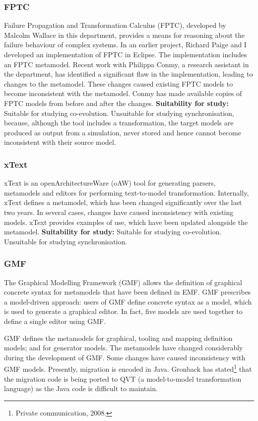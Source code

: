 \subsubsection{FPTC}
Failure Propagation and Transformation Calculus (FPTC), developed by Malcolm Wallace in this department, provides a means for reasoning about the failure behaviour of complex systems. In an earlier project, Richard Paige and I developed an implementation of FPTC in Eclipse. The implementation includes an FPTC metamodel. Recent work with Philippa Conmy, a research assistant in the department, has identified a significant flaw in the implementation, leading to changes to the metamodel. These changes caused existing FPTC models to become inconsistent with the metamodel. Conmy has made available copies of FPTC models from before and after the changes. \textbf{Suitability for study:} Suitable for studying co-evolution. Unsuitable for studying synchronisation, because, although the tool includes a transformation, the target models are produced as output from a simulation, never stored and hence cannot become inconsistent with their source model.

\subsubsection{xText}
xText is an openArchitectureWare (oAW) \cite{oaw} tool for generating parsers, metamodels and editors for performing text-to-model transformation. Internally, xText defines a metamodel, which has been changed significantly over the last two years. In several cases, changes have caused inconsistency with existing models. xText provides examples of use, which have been updated alongside the metamodel. \textbf{Suitability for study:} Suitable for studying co-evolution. Unsuitable for studying synchronisation.

\subsubsection{GMF}
The Graphical Modelling Framework (GMF) \cite{gronback06gmf} allows the definition of graphical concrete syntax for metamodels that have been defined in EMF. GMF prescribes a model-driven approach: users of GMF define concrete syntax as a model, which is used to generate a graphical editor. In fact, five models are used together to define a single editor using GMF.

GMF defines the metamodels for graphical, tooling and mapping definition models; and for generator models. The metamodels have changed considerably during the development of GMF. Some changes have caused inconsistency with GMF models. Presently, migration is encoded in Java. Gronback has stated\footnote{Private communication, 2008.} that the migration code is being ported to QVT (a model-to-model transformation language) as the Java code is difficult to maintain.

